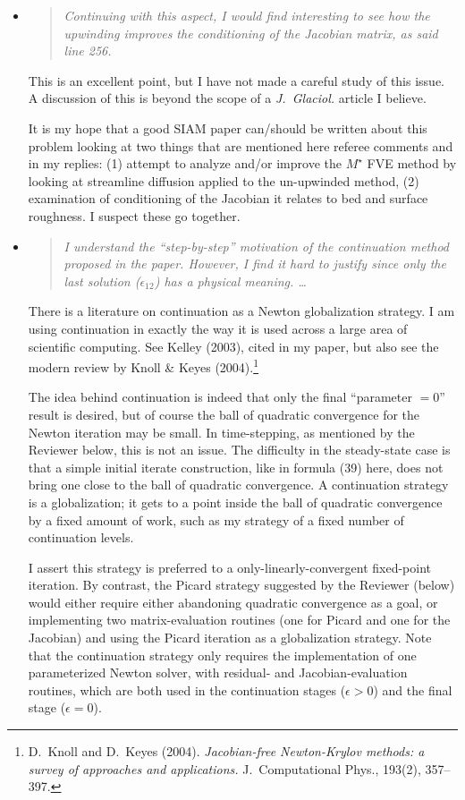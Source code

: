 \documentclass[11pt,reqno]{amsart}
\newcommand{\reply}[2]{
\medskip\medskip
\item  \begin{quote}
\emph{#1}
\end{quote}

\medskip
\noindent #2}
\begin{document}
\begin{itemize}
\reply{Continuing with this aspect, I would find interesting to see how the upwinding improves the conditioning of the Jacobian matrix, as said line 256.}
{This is an excellent point, but I have not made a careful study of this issue.  A discussion of this is beyond the scope of a \emph{J.~Glaciol.} article I believe.  

It is my hope that a good SIAM paper can/should be written about this problem looking at two things that are mentioned here referee comments and in my replies: (1) attempt to analyze and/or improve the $M^\star$ FVE method by looking at streamline diffusion applied to the un-upwinded method, (2) examination of conditioning of the Jacobian it relates to bed and surface roughness.  I suspect these go together.}

\reply{I understand the ``step-by-step'' motivation of the continuation method proposed
in the paper.  However, I find it hard to justify since only the last solution ($\epsilon_{12}$)
has a physical meaning. \dots}
{There is a literature on continuation as a Newton globalization strategy.  I am using continuation in exactly the way it is used across a large area of scientific computing.  See Kelley (2003), cited in my paper, but also see the modern review by Knoll \& Keyes (2004).\footnote{D.~Knoll and D.~Keyes (2004). \emph{Jacobian-free Newton-Krylov methods: a survey of approaches and applications.} J.~Computational Phys., 193(2), 357--397.}

The idea behind continuation is indeed that only the final ``parameter $=0$'' result is desired, but of course the ball of quadratic convergence for the Newton iteration may be small.  In time-stepping, as mentioned by the Reviewer below, this is not an issue.  The difficulty in the steady-state case is that a simple initial iterate construction, like in formula (39) here, does not bring one close to the ball of quadratic convergence.  A continuation strategy is a globalization; it gets to a point inside the ball of quadratic convergence by a fixed amount of work, such as my strategy of a fixed number of continuation levels.

I assert this strategy is preferred to a only-linearly-convergent fixed-point iteration.  By contrast, the Picard strategy suggested by the Reviewer (below) would either require either abandoning quadratic convergence as a goal, or implementing two matrix-evaluation routines (one for Picard and one for the Jacobian) and using the Picard iteration as a globalization strategy.  Note that the continuation strategy only requires the implementation of one parameterized Newton solver, with residual- and Jacobian-evaluation routines, which are both used in the continuation stages ($\epsilon>0$) and the final stage ($\epsilon=0$).}


\end{itemize}
\end{document}
